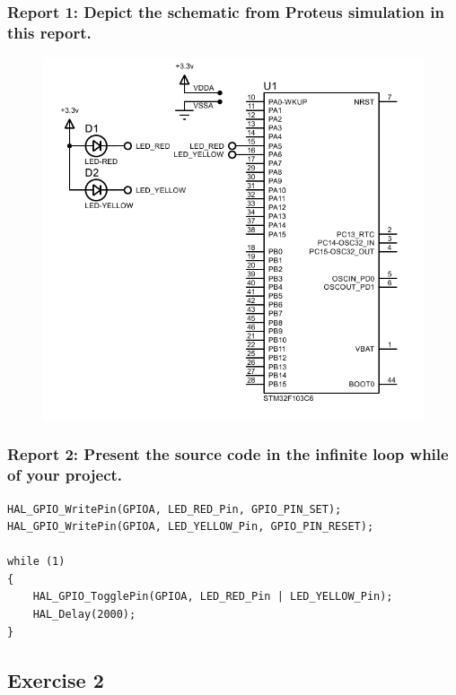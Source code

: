 \documentclass[a4paper,12pt]{article}
\begin{document}
\subsubsection{Report 1: Depict the schematic from Proteus simulation in this report.}
\label{ex1r1}
\begin{figure}[H]
    \centering
    \includegraphics[width=0.95\linewidth]{Attachments/1.1.1.PDF}
\end{figure}
\subsubsection{Report 2: Present the source code in the infinite loop while of your project.}
\begin{lstlisting}
HAL_GPIO_WritePin(GPIOA, LED_RED_Pin, GPIO_PIN_SET);
HAL_GPIO_WritePin(GPIOA, LED_YELLOW_Pin, GPIO_PIN_RESET);

while (1)
{
	HAL_GPIO_TogglePin(GPIOA, LED_RED_Pin | LED_YELLOW_Pin);
	HAL_Delay(2000);
}
\end{lstlisting}
\newpage
\subsection{Exercise 2}
\end{document}
